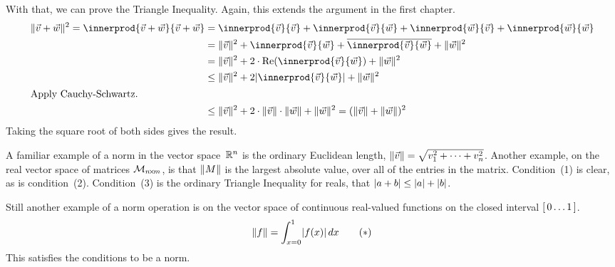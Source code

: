 With that, we can prove the Triangle Inequality.
Again, this extends the argument in the first chapter.
\begin{align*}
  \norm{\vec{v}+\vec{w}}^2
  =\innerprod{\vec{v}+\vec{w}}{\vec{v}+\vec{w}}  
  &=\innerprod{\vec{v}}{\vec{v}}
    +\innerprod{\vec{v}}{\vec{w}}  
    +\innerprod{\vec{w}}{\vec{v}}  
    +\innerprod{\vec{w}}{\vec{w}}   \\ 
  &=\norm{\vec{v}}^2
    +\innerprod{\vec{v}}{\vec{w}}  
    +\compconj{\innerprod{\vec{v}}{\vec{w}}}  
    +\norm{\vec{w}}^2              \\   
  &=\norm{\vec{v}}^2
    +2\cdot\RE{\innerprod{\vec{v}}{\vec{w}}}  
    +\norm{\vec{w}}^2      \\
  &\leq\norm{\vec{v}}^2
    +2\absval{\innerprod{\vec{v}}{\vec{w}}}  
    +\norm{\vec{w}}^2     \\
\intertext{Apply Cauchy-Schwartz.}
  &\leq\norm{\vec{v}}^2
    +2\cdot\norm{\vec{v}}\cdot\norm{\vec{w}}
    +\norm{\vec{w}}^2      
  =(\norm{\vec{v}}+\norm{\vec{w}})^2         
\end{align*}
Taking the square root of both sides gives the result.

A familiar example of a norm in the vector space~$\mathbb{R}^n$ is the ordinary
Euclidean length, $\lVert\vec{v}\rVert=\sqrt{v_1^2+\cdots+v_n^2}$.
Another example, on the real vector space of matrices
$\mathcal{M}_{n \! \times \! m}$, is that $\lVert M\rVert$ is the largest absolute value, 
over all of the entries in the matrix.  
Condition~(1) is clear, as is condition~(2).
Condition~(3) is the ordinary Triangle Inequality for reals, that
$\lvert a+b\rvert\leq\lvert a\rvert+\lvert b\rvert$.

Still another example of a norm operation 
is on the vector space of continuous real-valued functions 
on the closed interval $[\,0\ldots 1\,]$.  
\begin{equation*}
  \lVert f\rVert
  =\int_{x=0}^1 \lvert f(x)\rvert\,dx
  \tag{$*$}
\end{equation*}
This satisfies the conditions to be a norm.

